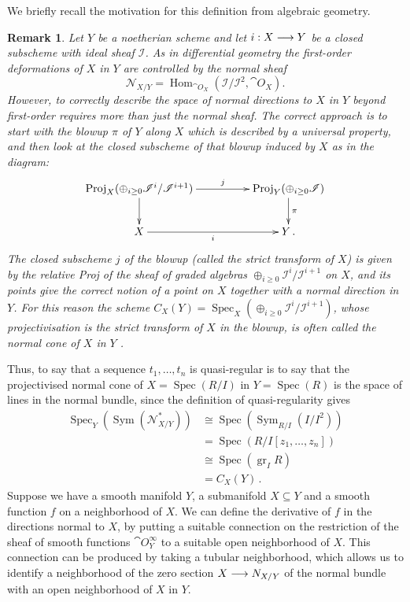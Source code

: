 \documentclass[english,letter paper,12pt,leqno]{article}
\theoremstyle{example}
\newtheorem{remark}[theorem]{Remark}
\numberwithin{equation}{section}
\def\Hom{\operatorname{Hom}}
\DeclareMathOperator{\Spec}{Spec}
\begin{document}
We briefly recall the motivation for this definition from algebraic geometry.

\begin{remark} Let $Y$ be a noetherian scheme and let $i: X \longrightarrow Y$ be a closed subscheme with ideal sheaf $\mathscr{I}$. As in differential geometry the first-order deformations of $X$ in $Y$ are controlled \cite[Theorem VI-29]{eisenbudharris} by the normal sheaf
\[
\mathscr{N}_{X/Y} = \Hom_{\cat{O}_X}(\mathscr{I}/\mathscr{I}^2, \cat{O}_X).
\]
However, to correctly describe the space of normal directions to $X$ in $Y$ beyond first-order requires more than just the normal sheaf. The correct approach is to start with the blowup $\pi$ of $Y$ along $X$ which is described by a universal property, and then look at the closed subscheme of that blowup induced by $X$ as in the diagram:
\[
\xymatrix@C+2pc{
\operatorname{Proj}_X( \oplus_{i \ge 0} \mathscr{I}^i/\mathscr{I}^{i+1} ) \ar[r]^-j\ar[d] & \operatorname{Proj}_Y( \oplus_{i \ge 0} \mathscr{I} ) \ar[d]^-{\pi}\\
X \ar[r]_-{i} & Y\,.
}
\]
The closed subscheme $j$ of the blowup (called the strict transform of $X$) is given by the relative Proj of the sheaf of graded algebras $\oplus_{i \ge 0} \mathscr{I}^i/\mathscr{I}^{i+1}$ on $X$, and its points give the correct notion of a point on $X$ together with a normal direction in $Y$. For this reason the scheme $C_X(Y) = \Spec_X( \oplus_{i \ge 0} \mathscr{I}^i / \mathscr{I}^{i+1} )$, whose projectivisation is the strict transform of $X$ in the blowup, is often called the \emph{normal cone} of $X$ in $Y$ \cite{??,??}.
\end{remark}

Thus, to say that a sequence $t_1,\ldots,t_n$ is quasi-regular is to say that the projectivised normal cone of $X = \Spec(R/I)$ in $Y = \Spec(R)$ is the space of lines in the normal bundle, since the definition of quasi-regularity gives 
\begin{align*}
\Spec_{Y}( \operatorname{Sym}( \mathscr{N}^*_{X/Y} ) ) &\cong \Spec( \operatorname{Sym}_{R/I}( I/I^2 ) )\\
&= \Spec( R/I[z_1,\ldots,z_n] )\\
&\cong \Spec( \operatorname{gr}_ I R)\\
&= C_X(Y)\,.
\end{align*}
Suppose we have a smooth manifold $Y$, a submanifold $X \subseteq Y$ and a smooth function $f$ on a neighborhood of $X$. We can define the derivative of $f$ in the directions normal to $X$, by putting a suitable connection on the restriction of the sheaf of smooth functions $\cat{O}_Y^\infty$ to a suitable open neighborhood of $X$. This connection can be produced by taking a tubular neighborhood, which allows us to identify a neighborhood of the zero section $X \longrightarrow N_{X/Y}$ of the normal bundle with an open neighborhood of $X$ in $Y$. 
\end{document}
